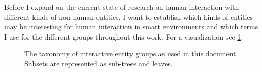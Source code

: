 Before I expand on the current state of research on human interaction with different kinds of non-human entities, I want to establish which kinds of entities may be interesting for human interaction in \glspl{smart environment} and which terms I use for the different groups throughout this work.
For a visualization see \cref{fig:rw.entities}.
\begin{figure}[htb]
    \centering
    \caption[Taxonomy of interactive entities.]{\label{fig:rw.entities} 
    The taxonomy of \gls{interactive entity} groups as used in this document.
    Subsets are represented as sub-trees and leaves.
    }
\end{figure}


